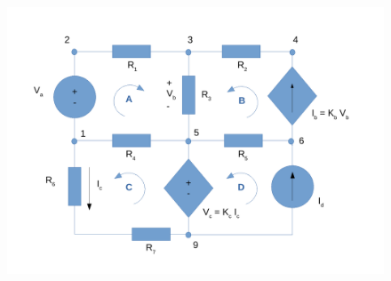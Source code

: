 \begin{equation}
  
  \label{eq:vo_for}
\end{equation}

\begin{figure}[h] \centering
\includegraphics[width=0.8\linewidth]{circuit_analysis.pdf}
\caption{}
\label{fig:forced}
\end{figure}
